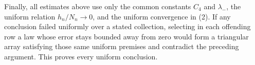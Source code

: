 Finally, all estimates above use only the common constants \(C_4\) and \(\lambda_-\), the uniform relation \(h_n/N_n\to0\), and the uniform convergence in (2).  If any conclusion failed uniformly over a stated collection, selecting in each offending row a law whose error stays bounded away from zero would form a triangular array satisfying those same uniform premises and contradict the preceding argument.  This proves every uniform conclusion.